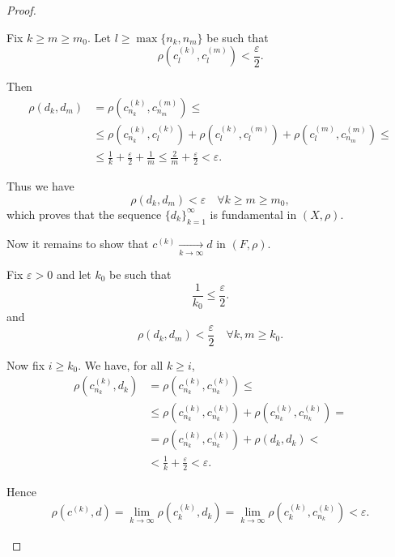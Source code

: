 \begin{proof}
\begin{defenum}
    Fix \( k \geq m \geq m_0 \). Let \( l \geq \max \{ n_k, n_m \} \) be such that
    \begin{equation*}
      \rho(c_l^{(k)}, c_l^{(m)}) < \frac \varepsilon 2.
    \end{equation*}

    Then
    \begin{align*}
      \rho(d_k, d_m)
      &=
      \rho(c_{n_k}^{(k)}, c_{n_m}^{(m)})
      \leq \\ &\leq
      \rho(c_{n_k}^{(k)}, c_l^{(k)}) + \rho(c_l^{(k)}, c_l^{(m)}) + \rho(c_l^{(m)}, c_{n_m}^{(m)})
      \leq \\ &\leq
      \frac 1 k + \frac \varepsilon 2 + \frac 1 m
      \leq
      \frac 2 m + \frac \varepsilon 2
      <
      \varepsilon.
    \end{align*}

    Thus we have
    \begin{equation*}
      \rho(d_k, d_m) < \varepsilon \quad\forall k \geq m \geq m_0,
    \end{equation*}
    which proves that the sequence \( \{ d_k \}_{k=1}^\infty \) is fundamental in \( (X, \rho) \).

    Now it remains to show that \( c^{(k)} \xrightarrow[k \to \infty]{} d \) in \( (F, \rho) \).

    Fix \( \varepsilon > 0 \) and let \( k_0 \) be such that
    \begin{equation*}
      \frac 1 {k_0} \leq \frac \varepsilon 2.
    \end{equation*}
    and
    \begin{equation*}
      \rho(d_k, d_m) < \frac \varepsilon 2 \quad\forall k, m \geq k_0.
    \end{equation*}

    Now fix \( i \geq k_0 \). We have, for all \( k \geq i \),
    \begin{align*}
      \rho(c_{n_k}^{(k)}, d_k)
      &=
      \rho(c_{n_k}^{(k)}, c_{n_k}^{(k)})
      \leq \\ &\leq
      \rho(c_{n_k}^{(k)}, c_{n_k}^{(k)}) + \rho(c_{n_k}^{(k)}, c_{n_k}^{(k)})
      = \\ &=
      \rho(c_{n_k}^{(k)}, c_{n_k}^{(k)}) + \rho(d_k, d_k)
      < \\ &<
      \frac 1 k + \frac \varepsilon 2
      <
      \varepsilon.
    \end{align*}

    Hence
    \begin{align*}
      \rho(c^{(k)}, d)
      =
      \lim_{k \to \infty} \rho(c_k^{(k)}, d_k)
      =
      \lim_{k \to \infty} \rho(c_k^{(k)}, c_{n_k}^{(k)})
      <
      \varepsilon.
    \end{align*}


\end{defenum}
\end{proof}
